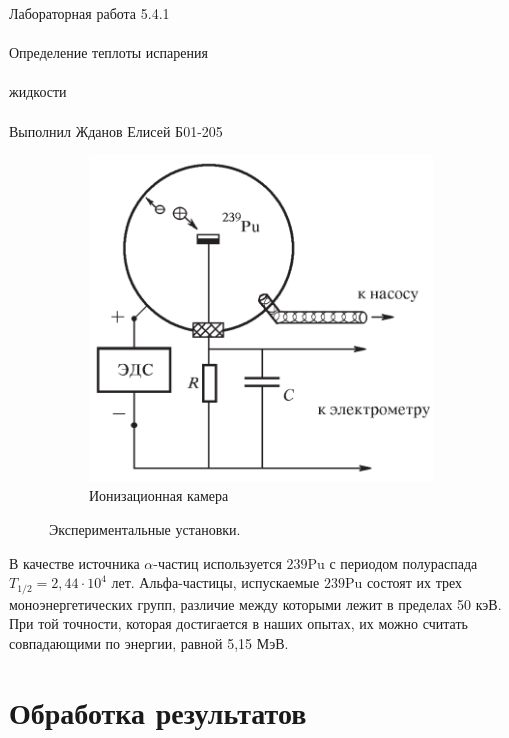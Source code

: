 \documentclass{astroedu-lab}
\begin{document}
\begin{problem}{\huge Лабораторная работа 5.4.1\\\\Определение теплоты испарения\\\\жидкости\\\\Выполнил Жданов Елисей Б01-205}
\begin{figure}[h!]
\begin{subfigure}{0.3\textwidth}
        \includegraphics[scale=1]{ustanovka3.pdf}
        \caption{Ионизационная камера}
        \label{pic3}
    \end{subfigure}
    \caption{Экспериментальные установки.}
    \label{fig:ustanovki}
\end{figure}

	
	В качестве источника $\alpha$-частиц используется ${239}$Pu с периодом полураспада $T_{1/2} = 2,44 \cdot 10^4$ лет. Альфа-частицы, испускаемые ${239}$Pu состоят их трех моноэнергетических групп, различие между которыми лежит в пределах 50 кэВ. При той точности, которая достигается в наших опытах, их можно считать совпадающими по энергии, равной 5,15 МэВ.
	

%
%
%
%
%




\section{Обработка результатов}

\end{problem}
\end{document}
